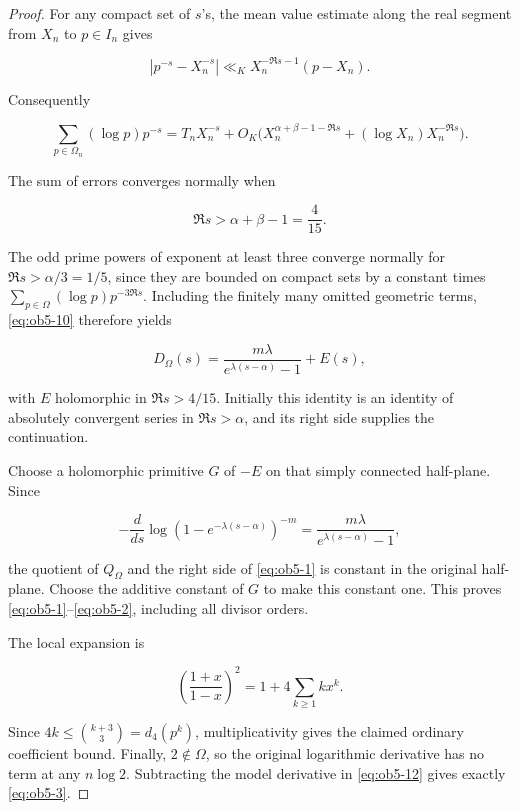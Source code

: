 \begin{proof}
For any compact set of \(s\)'s, the mean value estimate along the real segment from \(X_n\) to \(p\in I_n\) gives

\begin{equation}\label{eq:ob5-9}
|p^{-s}-X_n^{-s}|
\ll_K X_n^{-\Re s-1}(p-X_n).
\end{equation}

Consequently

\begin{equation}\label{eq:ob5-10}
\sum_{p\in\Omega_n}(\log p)p^{-s}
=T_nX_n^{-s}
+O_K\bigl(X_n^{\alpha+\beta-1-\Re s}
+(\log X_n)X_n^{-\Re s}\bigr).
\end{equation}

The sum of errors converges normally when

\begin{equation}\label{eq:ob5-11}
\Re s>\alpha+\beta-1=\frac4{15}.
\end{equation}

The odd prime powers of exponent at least three converge normally for \(\Re s>\alpha/3=1/5\), since they are bounded on compact sets by a constant times \(\sum_{p\in\Omega}(\log p)p^{-3\Re s}\). Including the finitely many omitted geometric terms, \eqref{eq:ob5-10} therefore yields

\begin{equation}\label{eq:ob5-12}
D_\Omega(s)
=\frac{m\lambda}{e^{\lambda(s-\alpha)}-1}+E(s),
\end{equation}

with \(E\) holomorphic in \(\Re s>4/15\). Initially this identity is an identity of absolutely convergent series in \(\Re s>\alpha\), and its right side supplies the continuation.

Choose a holomorphic primitive \(G\) of \(-E\) on that simply connected half-plane. Since

\begin{equation}\label{eq:ob5-13}
-\frac d{ds}\log(1-e^{-\lambda(s-\alpha)})^{-m}
=\frac{m\lambda}{e^{\lambda(s-\alpha)}-1},
\end{equation}

the quotient of \(Q_\Omega\) and the right side of \eqref{eq:ob5-1} is constant in the original half-plane. Choose the additive constant of \(G\) to make this constant one. This proves \eqref{eq:ob5-1}--\eqref{eq:ob5-2}, including all divisor orders.

The local expansion is

\begin{equation}\label{eq:ob5-14}
\left(\frac{1+x}{1-x}\right)^2
=1+4\sum_{k\ge1}k x^k.
\end{equation}

Since \(4k\le\binom{k+3}{3}=d_4(p^k)\), multiplicativity gives the claimed ordinary coefficient bound. Finally, \(2\notin\Omega\), so the original logarithmic derivative has no term at any \(n\log2\). Subtracting the model derivative in \eqref{eq:ob5-12} gives exactly \eqref{eq:ob5-3}. \end{proof}

